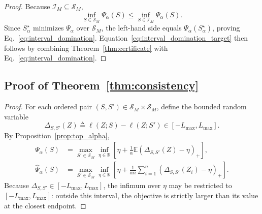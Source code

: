 \documentclass{article}
\newcommand{\RR}{\mathbb{R}}
\newcommand{\EE}{\mathbb{E}}
\newcommand{\cI}{\mathcal{I}}
\newcommand{\cS}{\mathcal{S}}
\newcommand{\paren}[1]{\left( #1 \right)}
\newcommand{\loss}{\ell}
\newcommand{\1}{\mathbbm{1}}
\begin{document}
\begin{proof}
Because \(\cI_M\subseteq\cS_M\),
\[
    \inf_{S\in\cS_M}\Psi_\alpha(S)
    \le
    \inf_{S\in\cI_M}\Psi_\alpha(S).
\]
Since \(S_\alpha^\star\) minimizes \(\Psi_\alpha\) over \(\cS_M\), the left-hand side equals \(\Psi_\alpha(S_\alpha^\star)\), proving Eq.~\eqref{eq:interval_domination}. Equation~\eqref{eq:interval_domination_target} then follows by combining Theorem~\ref{thm:certificate} with Eq.~\eqref{eq:interval_domination}.
\end{proof}

\subsection{Proof of Theorem~\ref{thm:consistency}}

\begin{proof}
For each ordered pair \((S,S')\in\cS_M\times\cS_M\), define the bounded random variable
\[
    \Delta_{S,S'}(Z) \triangleq \loss(Z;S)-\loss(Z;S') \in [-L_{\max},L_{\max}].
\]
By Proposition~\ref{prop:top_alpha},
\begin{align}
    \Psi_\alpha(S)
    &=
    \max_{S'\in\cS_M}
    \inf_{\eta\in\RR}
    \left[
        \eta + \frac{1}{\alpha}\EE\paren{\Delta_{S,S'}(Z)-\eta}_+
    \right],
    \label{eq:population_cvar_pair}
    \\
    \widehat{\Psi}_\alpha(S)
    &=
    \max_{S'\in\cS_M}
    \inf_{\eta\in\RR}
    \left[
        \eta + \frac{1}{\alpha n}\sum_{i=1}^{n}\paren{\Delta_{S,S'}(Z_i)-\eta}_+
    \right].
    \label{eq:empirical_cvar_pair}
\end{align}
Because \(\Delta_{S,S'}\in[-L_{\max},L_{\max}]\), the infimum over \(\eta\) may be restricted to \([-L_{\max},L_{\max}]\): outside this interval, the objective is strictly larger than its value at the closest endpoint.


\end{proof}
\end{document}
